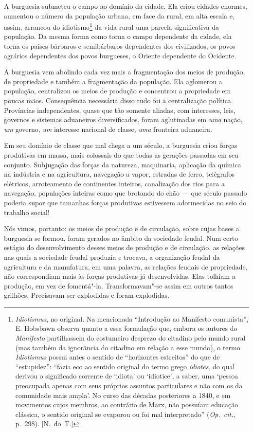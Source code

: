 A burguesia submeteu o campo ao domínio da cidade. Ela criou
cidades enormes, aumentou o número da população urbana, em face da
rural, em alta escala e, assim, arrancou do
idiotismo\footnote{ \textit{Idiotismus}, no original. Na mencionada “Introdução
ao Manifesto comunista”, E. Hobsbawn observa quanto a essa formulação que,
embora os autores do \textit{Manifesto} partilhassem do costumeiro
desprezo do citadino pelo mundo rural (mas também da ignorância do
citadino em relação a esse mundo), o termo \textit{Idiotismus} possui
antes o sentido de ``horizontes estreitos'' do que de ``estupidez'': ``fazia
eco ao sentido original do termo grego \textit{idiot\=es}, do qual derivou o
significado corrente de `idiota' ou `idiotice', a saber, uma `pessoa
preocupada apenas com seus próprios assuntos particulares e não com os
da comunidade mais ampla'. No curso das décadas posteriores a 1840, e
em movimentos cujos membros, ao contrário de Marx, não possuíam
educação clássica, o sentido original se evaporou ou foi mal
interpretado'' (\textit{Op.~cit.}, p.~298). [N.~do~T.]}
da vida rural uma parcela significativa da população. Da mesma
forma como torna o campo dependente da cidade, ela torna os países
bárbaros e semibárbaros dependentes dos civilizados, os povos agrários
dependentes dos povos burgueses, o Oriente dependente do Ocidente.

A burguesia vem abolindo cada vez mais a fragmentação dos meios de
produção, de propriedade e também a fragmentação da população. Ela
aglomerou a população, centralizou os meios de produção e concentrou a
propriedade em poucas mãos. Consequência necessária disso tudo foi a
centralização política. Províncias independentes, quase que
tão somente aliadas, com interesses, leis, governos e sistemas
aduaneiros diversificados, foram aglutinadas em \textit{uma} nação,
\textit{um} governo, \textit{um} interesse nacional de classe,
\textit{uma} fronteira aduaneira.

Em seu domínio de classe que mal chega a um século, a burguesia criou
forças produtivas em massa, mais colossais do que todas as gerações
passadas em seu conjunto. Subjugação das forças da natureza,
maquinaria, aplicação da química na indústria e na agricultura,
navegação a vapor, estradas de ferro, telégrafos elétricos,
arroteamento de continentes inteiros, canalização dos rios para a
navegação, populações inteiras como que brotando do chão  ---  que século
passado poderia supor que tamanhas forças produtivas estivessem
adormecidas no seio do trabalho social!

Nós vimos, portanto: os meios de produção e de circulação, sobre cujas
bases a burguesia se formou, foram gerados no âmbito da sociedade
feudal. Num certo estágio do desenvolvimento desses meios de produção e
de circulação, as relações nas quais a sociedade feudal produzia e
trocava, a organização feudal da agricultura e da manufatura, em uma
palavra, as relações feudais de propriedade, não correspondiam mais às
forças produtivas já desenvolvidas. Elas tolhiam a produção, em vez de
fomentá"-la. Transformavam"-se assim em outros tantos grilhões.
Precisavam ser explodidas e foram explodidas.

